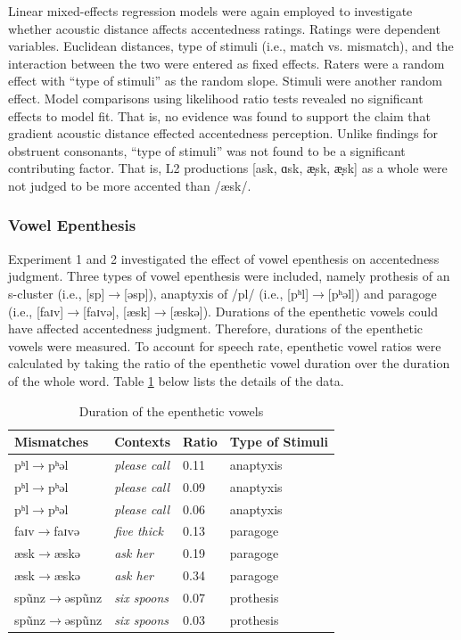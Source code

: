 Linear mixed-effects regression models were again employed to investigate whether acoustic distance affects accentedness ratings. Ratings were dependent variables. Euclidean distances, type of stimuli (i.e., match vs. mismatch), and the interaction between the two were entered as fixed effects. Raters were a random effect with “type of stimuli” as the random slope. Stimuli were another random effect. Model comparisons using likelihood ratio tests revealed no significant effects to model fit. That is, no evidence was found to support the claim that gradient acoustic distance effected accentedness perception. Unlike findings for obstruent consonants, “type of stimuli” was not found to be a significant contributing factor. That is, L2 productions [ask, ɑsk, æ̝sk, æ̞sk] as a whole were not judged to be more accented than /æsk/. 

\subsubsection{Vowel Epenthesis}

Experiment 1 and 2 investigated the effect of vowel epenthesis on accentedness judgment. Three types of vowel epenthesis were included, namely prothesis of an s-cluster (i.e., [sp]$\rightarrow$[əsp]), anaptyxis of /pl/ (i.e., [pʰl]$\rightarrow$[pʰəl]) and paragoge (i.e., [faɪv]$\rightarrow$[faɪvə], [æsk]$\rightarrow$[æskə]). Durations of the epenthetic vowels could have affected accentedness judgment. Therefore, durations of the epenthetic vowels were measured. To account for speech rate, epenthetic vowel ratios were calculated by taking the ratio of the epenthetic vowel duration over the duration of the whole word. Table \ref{tab:epen2} below lists the details of the data.
\begin{table}[h]
  \figSpace
  \centering
  \caption{Duration of the epenthetic vowels}
    \begin{tabular}{llll}
    \toprule
    Mismatches & Contexts & Ratio & Type of Stimuli \\
    \midrule
    pʰl$\rightarrow$pʰəl     & \textit{please call}& 0.11  & anaptyxis \\
     pʰl$\rightarrow$pʰəl    & \textit{please call} & 0.09  & anaptyxis \\
      pʰl$\rightarrow$pʰəl  & \textit{please call} & 0.06  & anaptyxis \\
     faɪv$\rightarrow$faɪvə     & \textit{five thick} & 0.13  & paragoge \\
      æsk$\rightarrow$æskə      & \textit{ask her}& 0.19  & paragoge \\
      æsk$\rightarrow$æskə    & \textit{ask her} & 0.34  & paragoge \\
     spũnz$\rightarrow$əspũnz     & \textit{six spoons} & 0.07  & prothesis \\
     spũnz$\rightarrow$əspũnz     & \textit{six spoons} & 0.03  & prothesis \\
     \bottomrule
    \end{tabular}%
  \label{tab:epen2}%
    \figSpace
\end{table}%

